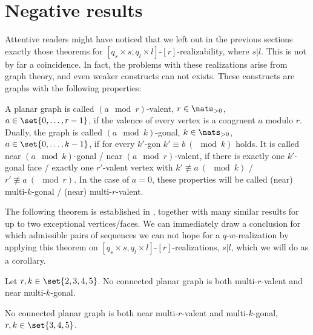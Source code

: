 \section{Negative results}\label{sec:negative:results}

Attentive readers might have noticed that we left out in the previous sections exactly those theorems for $[q_s \times s, q_l \times l]$-$[r]$-realizability, where $s | l$. This is not by far a coincidence. In fact, the problems with these realizations arise from graph theory, and even weaker constructs can not exists. These constructs are graphs with the following properties: 

\begin{definition}  A planar graph is called $(a \mod r)$-valent, $r \in \nats_{>0}$, $a \in \set{0, \dots, r - 1}$, if the valence of every vertex is a congruent $a$ modulo $r$. Dually, the graph is called $(a \mod k)$-gonal, $k \in \nats_{>0}$, $a \in \set{0, \dots, k - 1}$, if for every $k'$-gon $k' \equiv b ~(\mod k)$ holds. It is called near $(a \mod k)$-gonal / near $(a \mod r)$-valent, if there is exactly one $k'$-gonal face / exactly one $r'$-valent vertex with $k' \not\equiv a ~(\mod k)$ / $r' \not\equiv a ~(\mod r)$. In the case of $a = 0$, these properties will be called (near) multi-$k$-gonal / (near) multi-$r$-valent.
\end{definition}

The following theorem is established in \cite{malkevitch1970properties}, together with many similar results for up to two exceptional vertices/faces. We can immediately draw a conclusion for which admissible pairs of sequences we can not hope for a $q$-$w$-realization by applying this theorem on $[q_s \times s, q_l \times l]$-$[r]$-realizations, $s | l$, which we will do as a corollary.

\begin{theorem}\label{thm:near:regular:nonrealizable} Let $r, k \in \set{2, 3, 4, 5}$. No connected planar graph is both multi-$r$-valent and near multi-$k$-gonal.
\end{theorem}
\begin{corollary} No connected planar graph is both near multi-$r$-valent and multi-$k$-gonal, $r, k \in \set{3, 4, 5}$.
\end{corollary}

